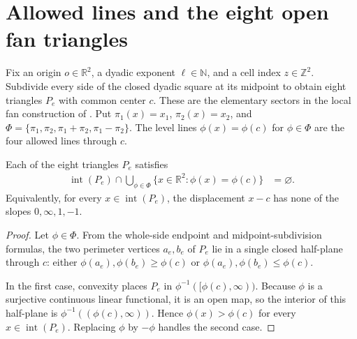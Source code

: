 \section{Allowed lines and the eight open fan triangles}
\label{sec:area_law_cell_fan_sectors}

Fix an origin $o\in\mathbb R^2$, a dyadic exponent $\ell\in\mathbb N$, and a
cell index $z\in\mathbb Z^2$. Subdivide every side of the closed dyadic square
at its midpoint to obtain eight triangles $P_e$ with common center $c$.
These are the elementary sectors in the local fan construction of
\cite[Section~11]{OpenAI2026AreaLaw}. Put $\pi_1(x)=x_1$, $\pi_2(x)=x_2$, and
$\Phi=\{\pi_1,\pi_2,\pi_1+\pi_2,\pi_1-\pi_2\}$.
The level lines $\phi(x)=\phi(c)$ for $\phi\in\Phi$ are the four allowed lines
through $c$.


\begin{lemma}
    \label{thm:area_law_cell_fan_sector_directions}
    \leanok
    Each of the eight triangles $P_e$ satisfies
    \begin{align}
        \operatorname{int}(P_e)\cap
        \bigcup_{\phi\in\Phi}\{x\in\mathbb R^2:\phi(x)=\phi(c)\}
         & =\varnothing.
    \end{align}
    Equivalently, for every $x\in\operatorname{int}(P_e)$, the displacement
    $x-c$ has none of the slopes $0,\infty,1,-1$.
\end{lemma}
\begin{proof}\leanok
    Let $\phi\in\Phi$. From the whole-side endpoint and midpoint-subdivision
    formulas, the two perimeter
    vertices $a_e,b_e$ of $P_e$ lie in a single closed half-plane through $c$:
    either $\phi(a_e),\phi(b_e)\ge\phi(c)$ or
    $\phi(a_e),\phi(b_e)\le\phi(c)$.

    In the first case, convexity places $P_e$ in
    $\phi^{-1}([\phi(c),\infty))$. Because $\phi$ is a surjective continuous
    linear functional, it is an open map, so the interior of this half-plane
    is $\phi^{-1}((\phi(c),\infty))$. Hence $\phi(x)>\phi(c)$ for every
    $x\in\operatorname{int}(P_e)$. Replacing $\phi$ by $-\phi$ handles the
    second case.
\end{proof}
